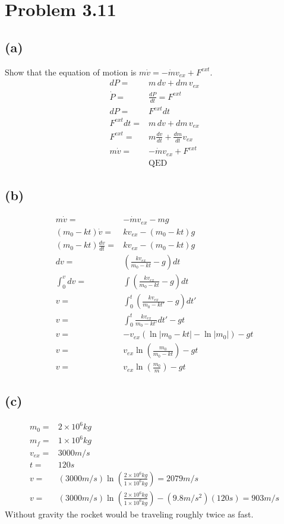 \documentclass[12pt, a4paper]{article}
\begin{document}
\pagebreak
\section*{Problem 3.11}
\subsection*{(a)}
Show that the equation of motion is $m\dot{v} = -\dot{m}v_{ex} + F^{ext}$.
\begin{align*}
dP =& m \,dv + dm \, v_{ex}
\\
\dot{P} =& \frac{dP}{dt} = F^{ext}
\\
dP =& F^{ext}dt
\\
F^{ext}dt =& m \,dv + dm \, v_{ex}
\\
F^{ext} =& m \frac{dv}{dt} + \frac{dm}{dt} v_{ex}
\\
m\dot{v} =& -\dot{m}v_{ex} + F^{ext}
\\
&\text{QED}
\end{align*}
\subsection*{(b)}
\begin{align*}
m\dot{v} =& -\dot{m}v_{ex} - mg
\\
(m_0-kt)\dot{v} =& kv_{ex} - (m_0-kt)g
\\
(m_0-kt)\frac{dv}{dt} =& kv_{ex} - (m_0-kt)g
\\
dv =& \left(\frac{kv_{ex}}{m_0-kt} - g\right) dt
\\
\int_0^v dv =& \int\left(\frac{kv_{ex}}{m_0-kt} - g\right) dt
\\
v =& \int_0^t \left(\frac{kv_{ex}}{m_0-kt'} - g\right) dt'
\\
v =& \int_0^t \frac{kv_{ex}}{m_0-kt'} dt' - gt
\\
v =& -v_{ex} (\ln|m_0-kt| - \ln|m_0|) - gt
\\
v =&  v_{ex} \ln\left( \frac{m_0}{m_0-kt} \right) - gt
\\
v =&  \boxed{v_{ex} \ln\left( \frac{m_0}{m} \right) - gt}
\end{align*}
\subsection*{(c)}
\begin{align*}
m_0 =& 2\times10^6kg
\\
m_f =& 1\times10^6kg
\\
v_{ex} =& 3000m/s
\\
t =& 120s
\\
v =&  (3000m/s) \ln\left( 
    \frac{2\times10^6kg}{1\times10^6kg} \right) = \boxed{2079m/s}
\\
v =&  (3000m/s) \ln\left( 
    \frac{2\times10^6kg}{1\times10^6kg} \right) - (9.8m/s^2)(120s)
    = \boxed{903m/s}
\end{align*}
Without gravity the rocket would be traveling roughly twice as fast. 
\end{document}
